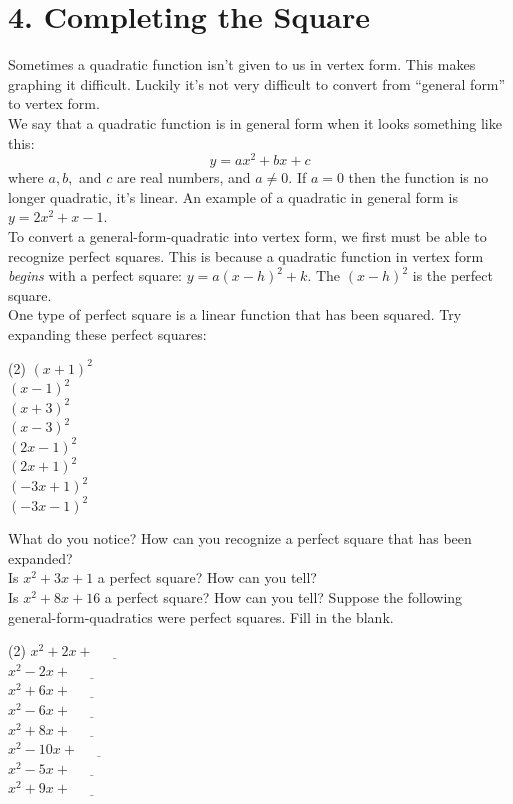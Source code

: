 \documentclass[12pt,fleqn]{book}
\begin{document}
\chapter{4. Completing the Square}
Sometimes a quadratic function isn't given to us in vertex form.  This makes graphing it difficult.  Luckily it's not very difficult to convert from ``general form'' to vertex form.
\\[1em]
We say that a quadratic function is in general form when it looks something like this:
\[
	y=ax^2+bx+c
\]
where $a,b,$ and $c$ are real numbers, and $a\ne 0$.  If $a=0$ then the function is no longer quadratic, it's linear.  An example of a quadratic in general form is $y=2x^2+x-1$.
\\[1em]
To convert a general-form-quadratic into vertex form, we first must be able to recognize perfect squares.  This is because a quadratic function in vertex form \emph{begins} with a perfect square: $y=a(x-h)^2+k$.  The $(x-h)^2$ is the perfect square.
\\[1em]
One type of perfect square is a linear function that has been squared.  Try expanding these perfect squares:
\begin{tasks}(2)
	\task $(x+1)^2$\\[3em]
	\task $(x-1)^2$\\[3em]
	\task $(x+3)^2$\\[3em]
	\task $(x-3)^2$\\[3em]
	\task $(2x-1)^2$\\[3em]
	\task $(2x+1)^2$\\[3em]
	\task $(-3x+1)^2$\\[3em]
	\task $(-3x-1)^2$\\[3em]
\end{tasks}
What do you notice?  How can you recognize a perfect square that has been expanded?
\\[2em]
Is $x^2+3x+1$ a perfect square?  How can you tell?
\\[2em]
Is $x^2+8x+16$ a perfect square?  How can you tell?
\clearpage
Suppose the following general-form-quadratics were perfect squares. Fill in the blank.\\[1em]
\begin{tasks}(2)
	\task $x^2+2x+\underline{\hspace{3em}}$\\[2em]
	\task $x^2-2x+\underline{\hspace{3em}}$\\[2em]
	\task $x^2+6x+\underline{\hspace{3em}}$\\[2em]
	\task $x^2-6x+\underline{\hspace{3em}}$\\[2em]
	\task $x^2+8x+\underline{\hspace{3em}}$\\[2em]
	\task $x^2-10x+\underline{\hspace{3em}}$\\[2em]
	\task $x^2-5x+\underline{\hspace{3em}}$\\[2em]
	\task $x^2+9x+\underline{\hspace{3em}}$\\[2em]
\end{tasks}
\end{document}
